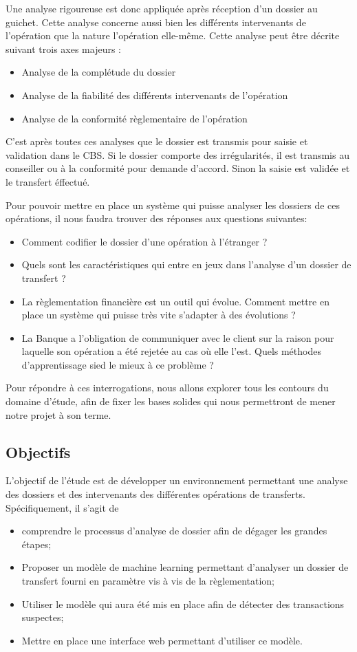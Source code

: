 Une analyse rigoureuse est donc appliquée après réception d’un dossier au guichet.
Cette analyse concerne aussi bien les différents intervenants de l'opération que
la nature l'opération elle-même.
Cette analyse peut être décrite suivant trois axes majeurs :
\begin{itemize}
  \item Analyse de la complétude du dossier 
  \item Analyse de la fiabilité des différents intervenants de l'opération 
  \item Analyse de la conformité règlementaire de l'opération
\end{itemize}
C'est après toutes ces analyses que le dossier est transmis pour saisie et
validation dans  le CBS. Si le dossier comporte des 
irrégularités, il est transmis au conseiller ou à la conformité pour demande
d'accord. Sinon la saisie est validée et le transfert éffectué.

Pour pouvoir mettre en place un système qui puisse analyser les dossiers de ces
opérations, il nous faudra trouver des réponses aux questions suivantes:
\begin{itemize}
  \item Comment codifier le dossier d'une opération à l'étranger ?
  \item Quels sont les caractéristiques qui entre en jeux dans l'analyse d'un
    dossier de transfert ?
  \item La règlementation financière est un outil  qui évolue. Comment mettre en
    place un système qui puisse très vite s'adapter à des évolutions ?
  \item La Banque a l'obligation de communiquer avec le client sur la raison
    pour laquelle son opération a été rejetée au cas où elle l'est. Quels 
    méthodes d'apprentissage sied le mieux à ce problème ?
\end{itemize}
Pour répondre à ces interrogations, nous allons explorer tous les contours du
domaine d'étude, afin de fixer les bases solides qui nous permettront de mener
notre projet à son terme.

\subsection{Objectifs}

L’objectif de l’étude est de développer un environnement permettant une analyse des dossiers et des 
intervenants des différentes opérations de transferts.
Spécifiquement, il s'agit de 
\begin{itemize}
\item comprendre le processus d'analyse de dossier afin de dégager les grandes étapes;
\item Proposer un modèle de machine learning permettant d'analyser un dossier de
  transfert fourni en paramètre vis à vis de la règlementation;
\item Utiliser le modèle qui aura été mis en place afin de détecter des
  transactions suspectes;
\item Mettre en place une interface web permettant d'utiliser ce modèle.
\end{itemize}

